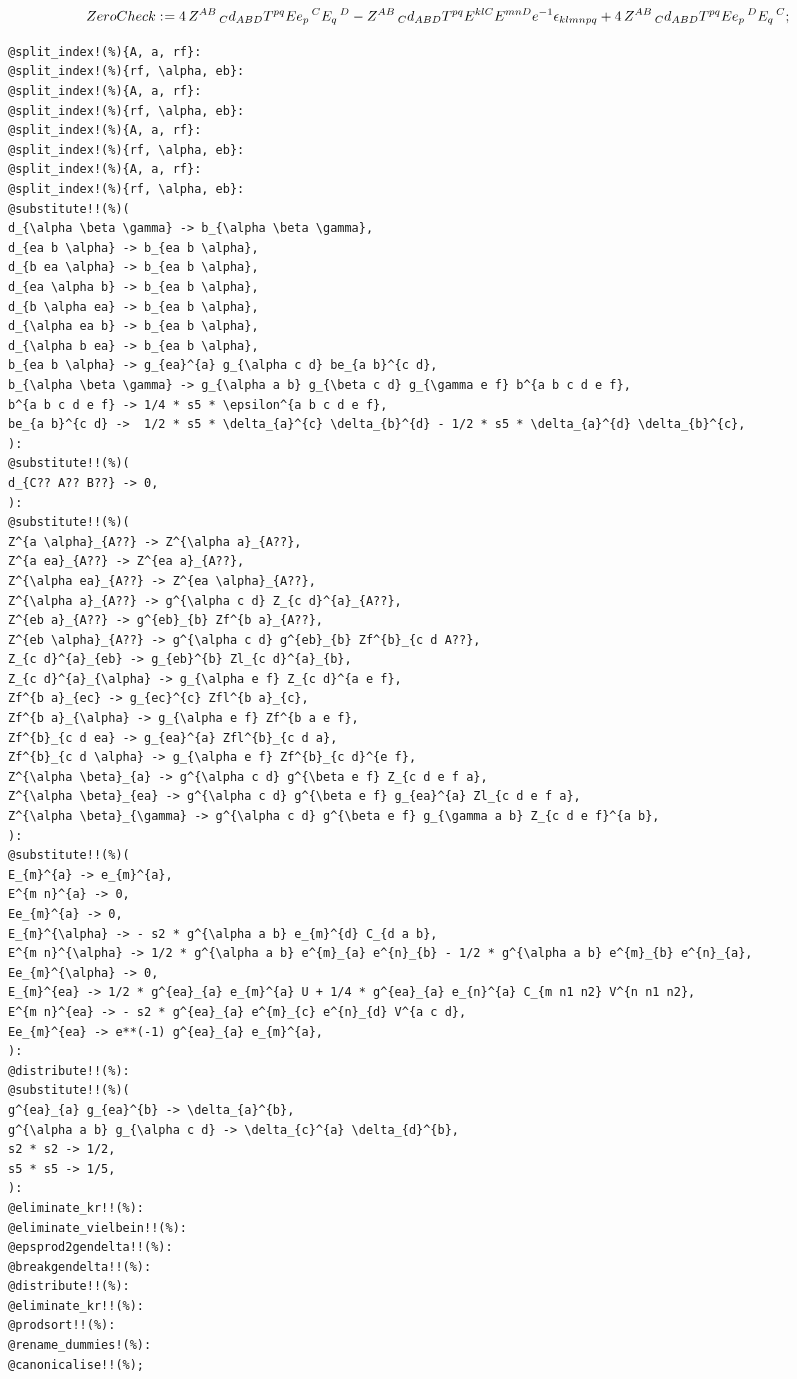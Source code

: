 \documentclass[11pt]{article}
\def\specialcolon{\mathrel{\mathop{:}}\hspace{-.5em}}
\begin{document}
\begin{dmath*}[compact, spread=2pt]
ZeroCheck\specialcolon{}= 4\, {Z}^{A B}\,_{C} {d}_{A B D} {T}^{p q} {Ee}_{p}\,^{C} {E}_{q}\,^{D} - {Z}^{A B}\,_{C} {d}_{A B D} {T}^{p q} {E}^{k l C} {E}^{m n D} e{}^{-1} {\epsilon}_{k l m n p q} + 4\, {Z}^{A B}\,_{C} {d}_{A B D} {T}^{p q} {Ee}_{p}\,^{D} {E}_{q}\,^{C};
\end{dmath*}
{\color[named]{Blue}\begin{verbatim}
@split_index!(%){A, a, rf}:
@split_index!(%){rf, \alpha, eb}:
@split_index!(%){A, a, rf}:
@split_index!(%){rf, \alpha, eb}:
@split_index!(%){A, a, rf}:
@split_index!(%){rf, \alpha, eb}:
@split_index!(%){A, a, rf}:
@split_index!(%){rf, \alpha, eb}:
@substitute!!(%)(
d_{\alpha \beta \gamma} -> b_{\alpha \beta \gamma},
d_{ea b \alpha} -> b_{ea b \alpha},
d_{b ea \alpha} -> b_{ea b \alpha},
d_{ea \alpha b} -> b_{ea b \alpha},
d_{b \alpha ea} -> b_{ea b \alpha},
d_{\alpha ea b} -> b_{ea b \alpha},
d_{\alpha b ea} -> b_{ea b \alpha},
b_{ea b \alpha} -> g_{ea}^{a} g_{\alpha c d} be_{a b}^{c d},
b_{\alpha \beta \gamma} -> g_{\alpha a b} g_{\beta c d} g_{\gamma e f} b^{a b c d e f},
b^{a b c d e f} -> 1/4 * s5 * \epsilon^{a b c d e f},
be_{a b}^{c d} ->  1/2 * s5 * \delta_{a}^{c} \delta_{b}^{d} - 1/2 * s5 * \delta_{a}^{d} \delta_{b}^{c},
):
@substitute!!(%)(
d_{C?? A?? B??} -> 0,
):
@substitute!!(%)(
Z^{a \alpha}_{A??} -> Z^{\alpha a}_{A??},
Z^{a ea}_{A??} -> Z^{ea a}_{A??},
Z^{\alpha ea}_{A??} -> Z^{ea \alpha}_{A??},
Z^{\alpha a}_{A??} -> g^{\alpha c d} Z_{c d}^{a}_{A??},
Z^{eb a}_{A??} -> g^{eb}_{b} Zf^{b a}_{A??},
Z^{eb \alpha}_{A??} -> g^{\alpha c d} g^{eb}_{b} Zf^{b}_{c d A??},
Z_{c d}^{a}_{eb} -> g_{eb}^{b} Zl_{c d}^{a}_{b},
Z_{c d}^{a}_{\alpha} -> g_{\alpha e f} Z_{c d}^{a e f},
Zf^{b a}_{ec} -> g_{ec}^{c} Zfl^{b a}_{c},
Zf^{b a}_{\alpha} -> g_{\alpha e f} Zf^{b a e f},
Zf^{b}_{c d ea} -> g_{ea}^{a} Zfl^{b}_{c d a},
Zf^{b}_{c d \alpha} -> g_{\alpha e f} Zf^{b}_{c d}^{e f},
Z^{\alpha \beta}_{a} -> g^{\alpha c d} g^{\beta e f} Z_{c d e f a},
Z^{\alpha \beta}_{ea} -> g^{\alpha c d} g^{\beta e f} g_{ea}^{a} Zl_{c d e f a},
Z^{\alpha \beta}_{\gamma} -> g^{\alpha c d} g^{\beta e f} g_{\gamma a b} Z_{c d e f}^{a b},
):
@substitute!!(%)(
E_{m}^{a} -> e_{m}^{a},
E^{m n}^{a} -> 0,
Ee_{m}^{a} -> 0,
E_{m}^{\alpha} -> - s2 * g^{\alpha a b} e_{m}^{d} C_{d a b},
E^{m n}^{\alpha} -> 1/2 * g^{\alpha a b} e^{m}_{a} e^{n}_{b} - 1/2 * g^{\alpha a b} e^{m}_{b} e^{n}_{a},
Ee_{m}^{\alpha} -> 0,
E_{m}^{ea} -> 1/2 * g^{ea}_{a} e_{m}^{a} U + 1/4 * g^{ea}_{a} e_{n}^{a} C_{m n1 n2} V^{n n1 n2},
E^{m n}^{ea} -> - s2 * g^{ea}_{a} e^{m}_{c} e^{n}_{d} V^{a c d},
Ee_{m}^{ea} -> e**(-1) g^{ea}_{a} e_{m}^{a},
):
@distribute!!(%):
@substitute!!(%)(
g^{ea}_{a} g_{ea}^{b} -> \delta_{a}^{b},
g^{\alpha a b} g_{\alpha c d} -> \delta_{c}^{a} \delta_{d}^{b},
s2 * s2 -> 1/2,
s5 * s5 -> 1/5,
):
@eliminate_kr!!(%):
@eliminate_vielbein!!(%):
@epsprod2gendelta!!(%):
@breakgendelta!!(%):
@distribute!!(%):
@eliminate_kr!!(%):
@prodsort!!(%):
@rename_dummies!(%):
@canonicalise!!(%);
\end{verbatim}}
\end{document}
